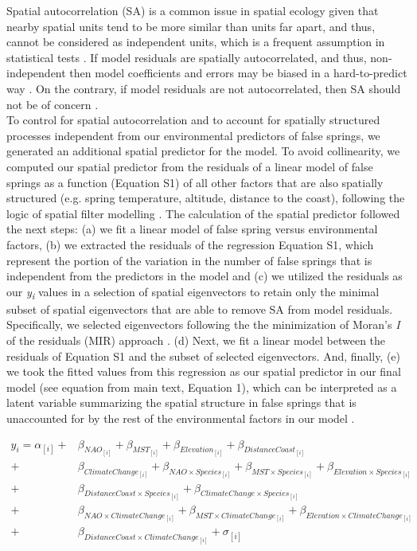 \documentclass{article}\usepackage[]{graphicx}\usepackage[]{color}
\begin{document}
Spatial autocorrelation (SA) is a common issue in spatial ecology given that nearby spatial units tend to be more similar than units far apart, and thus, cannot be considered as independent units, which is a frequent assumption in statistical tests \citep{diniz2003spatial}. If model residuals are spatially autocorrelated, and thus, non-independent then model coefficients and errors may be biased in a hard-to-predict way \citep{mauricio2009coefficient}. On the contrary, if model residuals are not autocorrelated, then SA should not be of concern \citep{hawkins2012eight}.\\

To control for spatial autocorrelation and to account for spatially structured processes independent from our environmental predictors of false springs, we generated an additional spatial predictor for the model. To avoid collinearity, we computed our spatial predictor from the residuals of a linear model of false springs as a function (Equation S1) of all other factors that are also spatially structured (e.g. spring temperature, altitude, distance to the coast), following the logic of spatial filter modelling \citep{diniz2005modelling}. The calculation of the spatial predictor followed the next steps: (a) we fit a linear model of false spring versus environmental factors, (b) we extracted the residuals of the regression Equation S1, which represent the portion of the variation in the number of false springs that is independent from the predictors in the model and (c) we utilized the residuals as our \textit{y\textsubscript{i}} values in a selection of spatial eigenvectors to retain only the minimal subset of spatial eigenvectors that are able to remove SA from model residuals. Specifically, we selected eigenvectors following the the minimization of Moran's \textit{I} of the residuals (MIR) approach \citep{griffith2006spatial,diniz2012selection,Baumen2017}. (d) Next, we fit a linear model between the residuals of Equation S1 and the subset of selected eigenvectors. And, finally, (e) we took the fitted values from this regression as our spatial predictor in our final model (see equation from main text, Equation 1), which can be interpreted as a latent variable summarizing the spatial structure in false springs that is unaccounted for by the rest of the environmental factors in our model \citep{morales2012imprint}. 

\begin{align*}
y_i = \alpha_{[i]} +&  \beta_{NAO_{[i]}} + \beta_{MST_{[i]}} + \beta_{Elevation_{[i]}} + \beta_{DistanceCoast_{[i]}} \\ +& \beta_{ClimateChange_{[i]}}
+ \beta_{NAO \times Species_{[i]}} + \beta_{MST \times Species_{[i]}} + \beta_{Elevation \times Species_{[i]}} \\ +& \beta_{DistanceCoast \times Species_{[i]}} + \beta_{ClimateChange \times Species_{[i]}} \\
+& \beta_{NAO \times ClimateChange_{[i]}} + \beta_{MST \times ClimateChange_{[i]}} 
+ \beta_{Elevation \times ClimateChange_{[i]}} \\ +& \beta_{DistanceCoast \times ClimateChange_{[i]}} + \sigma_{[i]} \tag{S1}
\end{align*}
\end{document}
